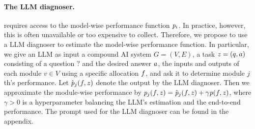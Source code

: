 \paragraph{The LLM diagnoser.} \deluxesystem{} requires access to the model-wise performance function $\mathit{p}_i$. In practice, however, this is often unavailable or too expensive to collect. Therefore, we propose to use a LLM diagnoser to estimate the model-wise performance function. In particular, we give an LLM as input a compound AI system $G=(V,E)$, a task $z = (q,a)$ consisting of a question $\question$ and the desired answer $a$, the inputs and outputs of each module $v \in V$ using a specific allocation $f$, and ask it to determine module $j$th's performance. Let  $\hat{\mathit{p}}_j(f,z)$ denote the output by the LLM  diagnoser. Then we approximate the module-wise performance by 
${\mathit{p}}_j(f,z) = \hat{\mathit{p}}_j(f,z) + \gamma {\mathit{p}}(f,z)$, where $\gamma>0$ is a hyperparameter balancing the LLM's estimation and the end-to-end performance. The prompt used for the LLM diagnoser can be found in the appendix.

